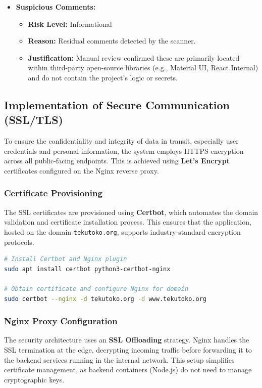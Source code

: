 \begin{itemize}
    \item \textbf{Suspicious Comments:}
    \begin{itemize}
        \item \textbf{Risk Level:} Informational
        \item \textbf{Reason:} Residual comments detected by the scanner.
        \item \textbf{Justification:} Manual review confirmed these are primarily located within third-party open-source libraries (e.g., Material UI, React Internal) and do not contain the project's logic or secrets.
    \end{itemize}
\end{itemize}

\subsection{Implementation of Secure Communication (SSL/TLS)}
To ensure the confidentiality and integrity of data in transit, especially user credentials and personal information, the system employs HTTPS encryption across all public-facing endpoints. This is achieved using \textbf{Let's Encrypt} certificates configured on the Nginx reverse proxy.

\subsubsection{Certificate Provisioning}
The SSL certificates are provisioned using \textbf{Certbot}, which automates the domain validation and certificate installation process. This ensures that the application, hosted on the domain \texttt{tekutoko.org}, supports industry-standard encryption protocols.

\begin{lstlisting}[language=bash, caption={Certbot Command for SSL Auto-configuration}, label={lst:certbot}]
# Install Certbot and Nginx plugin
sudo apt install certbot python3-certbot-nginx

# Obtain certificate and configure Nginx for domain
sudo certbot --nginx -d tekutoko.org -d www.tekutoko.org
\end{lstlisting}

\subsubsection{Nginx Proxy Configuration}
The security architecture uses an \textbf{SSL Offloading} strategy. Nginx handles the SSL termination at the edge, decrypting incoming traffic before forwarding it to the backend services running in the internal network. This setup simplifies certificate management, as backend containers (Node.js) do not need to manage cryptographic keys.

